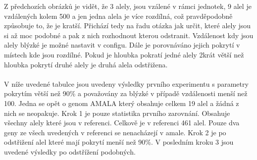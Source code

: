 \documentclass[czech,DP]{thesiskiv}
\numberwithin{equation}{section}
\begin{document}
\noindent
Z předchozích obrázků je vidět, že 3 alely, jsou vzálené v rámci jednotek, 9 alel je vzdálených kolem 500 a jen jedna alela je více rozdílná, což pravděpodobně způsobuje to, že je kratší. Přichází tedy na řadu otázka jak určit, které alely jsou si až moc podobné a pak z nich rozhodnout kterou odstranit. Vzdálenost kdy jsou alely blýzké je možné nastavit v configu. Dále je porovnáváno jejich pokrytí v místech kde jsou rozdílné. Pokud je hloubka pokratí jedné alely 2krát větší než hloubka pokrytí druhé alely je druhá alela odstřižena.
\\
\\
V níže uvedené tabulce jsou uvedeny výsledky prvního experimentu s parametry pokrytím větší než 90\% a považovány za blýzké v případě vzdálenosti menší než 100. Jedna se opět o genom AMALA který obsahuje celkem 19 alel a žádná z nich se neopakuje. Krok 1 je pouze statistika prvního zarovnání. Obsahuje všechny alely které jsou v referenci. Celkově je v referenci 461 alel. Pouze dva geny ze všech uvedených v referenci se nenacházejí v amale. Krok 2 je po odstřižení alel které mají pokrytí menší než 90\%. V posledním kroku 3 jsou uvedené výsledky po odstřížení podobných.
\end{document}
